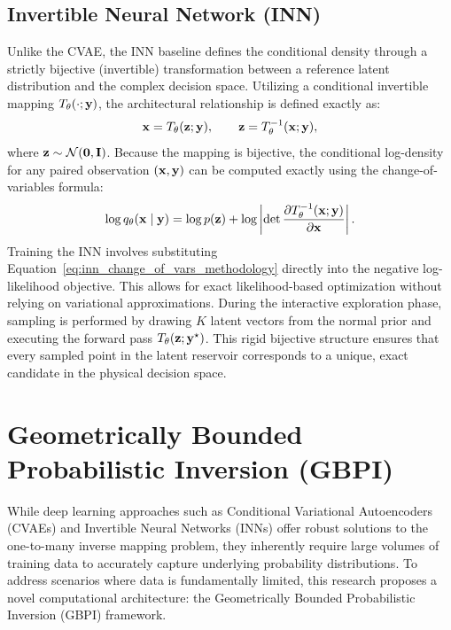 \subsection{Invertible Neural Network (INN)}\label{subsec:inn_training}

Unlike the CVAE, the INN baseline defines the conditional density through a strictly bijective (invertible) transformation between a reference latent distribution and the complex decision space. Utilizing a conditional invertible mapping $T_{\theta}(\cdot;\mathbf{y})$, the architectural relationship is defined exactly as:
\begin{equation}
  \mathbf{x} = T_{\theta}(\mathbf{z};\mathbf{y}),\qquad \mathbf{z} = T_{\theta}^{-1}(\mathbf{x};\mathbf{y}),
  \label{eq:inn_forward_map_methodology}
\end{equation}
where $\mathbf{z} \sim \mathcal{N}(\mathbf{0},\mathbf{I})$. Because the mapping is bijective, the conditional log-density for any paired observation $(\mathbf{x}, \mathbf{y})$ can be computed exactly using the change-of-variables formula:
\begin{equation}
  \log q_{\theta}(\mathbf{x}\mid\mathbf{y}) =
  \log p(\mathbf{z}) +
  \log\left|\det \frac{\partial T_{\theta}^{-1}(\mathbf{x};\mathbf{y})}{\partial \mathbf{x}}\right|.
  \label{eq:inn_change_of_vars_methodology}
\end{equation}
Training the INN involves substituting Equation~\eqref{eq:inn_change_of_vars_methodology} directly into the negative log-likelihood objective. This allows for exact likelihood-based optimization without relying on variational approximations. During the interactive exploration phase, sampling is performed by drawing $K$ latent vectors from the normal prior and executing the forward pass $T_{\theta}(\mathbf{z};\mathbf{y}^{\star})$. This rigid bijective structure ensures that every sampled point in the latent reservoir corresponds to a unique, exact candidate in the physical decision space.


\section{Geometrically Bounded Probabilistic Inversion (GBPI)}
\label{sec:gbpi_framework}

While deep learning approaches such as Conditional Variational Autoencoders (CVAEs) and Invertible Neural Networks (INNs) offer robust solutions to the one-to-many inverse mapping problem, they inherently require large volumes of training data to accurately capture underlying probability distributions. To address scenarios where data is fundamentally limited, this research proposes a novel computational architecture: the Geometrically Bounded Probabilistic Inversion (GBPI) framework. 

